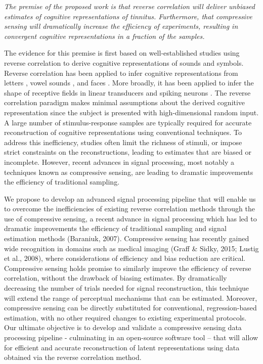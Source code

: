 \documentclass[11pt, notitlepage]{article} %
\begin{document}
\emph{The premise of the proposed work is that reverse correlation will deliver unbiased estimates
of cognitive representations of tinnitus. Furthermore, that compressive sensing will dramatically
increase the efficiency of experiments, resulting in convergent cognitive representations
in a fraction of the samples.}

The evidence for this premise is first based on well-established studies using reverse correlation
to derive cognitive representations of sounds and symbols.
Reverse correlation has been applied to infer cognitive representations from letters
\cite{gosselinSuperstitiousPerceptionsReveal2003}, vowel sounds \cite{brimijoinInternalRepresentationVowel2013},
and faces \cite{brinkmanVisualisingMentalRepresentations2017,smithMeasuringInternalRepresentations2012}.
More broadly, it has been applied to infer the shape of receptive fields
in linear transducers and spiking neurons \cite{ringachReverseCorrelationNeurophysiology2004}.
The reverse correlation paradigm makes minimal assumptions about the derived cognitive representation
since the subject is presented with high-dimensional random input.
A large number of stimulus-response samples are typically required for accurate
reconstruction of cognitive representations using conventional techniques. To address this inefficiency,
studies often limit the richness of stimuli, or impose strict constraints on the reconstructions, leading to
estimates that are biased or incomplete. However, recent advances in signal processing, most notably
a techniques known as compressive sensing, are leading to dramatic improvements the efficiency of
traditional sampling.

We propose to develop an advanced signal processing pipeline that will enable us to overcome
the inefficiencies of existing reverse correlation methods through the use of compressive sensing, a
recent advance in signal processing which has led to dramatic improvements the efficiency of traditional
sampling and signal estimation methods (Baraniuk, 2007). Compressive sensing has recently gained
wide recognition in domains such as medical imaging (Graff \& Sidky, 2015; Lustig et al., 2008), where
considerations of efficiency and bias reduction are critical. Compressive sensing holds promise to
similarly improve the efficiency of reverse correlation, without the drawback of biasing estimates. By
dramatically decreasing the number of trials needed for signal reconstruction, this technique will extend
the range of perceptual mechanisms that can be estimated. Moreover, compressive sensing can be
directly substituted for conventional, regression-based estimation, with no other required changes to
existing experimental protocols. Our ultimate objective is to develop and validate a compressive sensing
data processing pipeline - culminating in an open-source software tool – that will allow for efficient and
accurate reconstruction of latent representations using data obtained via the reverse correlation method.
\end{document}
